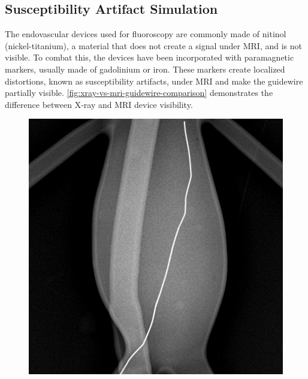 \documentclass[conference]{IEEEtran}
\begin{document}
\subsection{Susceptibility Artifact Simulation}\label{artifact-simulation}
The endovascular devices used for fluoroscopy are commonly made of nitinol (nickel-titanium), a material that does not create a signal under MRI, and is not visible. To combat this, the devices have been incorporated with paramagnetic markers, usually made of gadolinium or iron. These markers create localized distortions, known as susceptibility artifacts, under MRI and make the guidewire partially visible. \autoref{fig:xray-vs-mri-guidewire-comparison} demonstrates the difference between X-ray and MRI device visibility. 

\begin{figure}[h]
    \centering
    \begin{minipage}{0.241\textwidth}
        \centering
        \includegraphics[width=\textwidth]{Conference/img/xray-device-visibility.png}
    \end{minipage}\hfill \hspace*{0cm}
    \begin{minipage}{0.241\textwidth}
        \centering

\end{minipage}
\end{figure}
\end{document}
